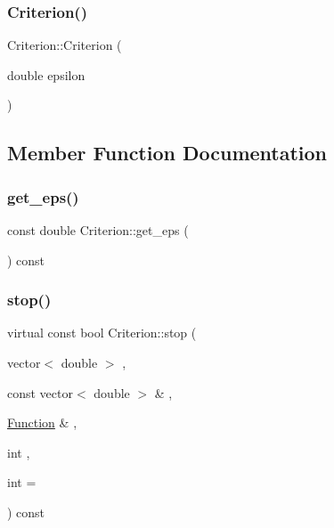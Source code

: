 \subsubsection{\texorpdfstring{Criterion()}{Criterion()}}
{\footnotesize\ttfamily Criterion\+::\+Criterion (\begin{DoxyParamCaption}\item[{double}]{epsilon }\end{DoxyParamCaption})\hspace{0.3cm}{\ttfamily [inline]}}



\subsection{Member Function Documentation}
\mbox{\label{class_criterion_aa0bb13b321141cb530b259e190606f81}} 
\subsubsection{\texorpdfstring{get\+\_\+eps()}{get\_eps()}}
{\footnotesize\ttfamily const double Criterion\+::get\+\_\+eps (\begin{DoxyParamCaption}{ }\end{DoxyParamCaption}) const\hspace{0.3cm}{\ttfamily [inline]}}

\mbox{\label{class_criterion_aee3e2148c665c72c50c2f870a3ca8cdc}} 
\subsubsection{\texorpdfstring{stop()}{stop()}}
{\footnotesize\ttfamily virtual const bool Criterion\+::stop (\begin{DoxyParamCaption}\item[{vector$<$ double $>$}]{,  }\item[{const vector$<$ double $>$ \&}]{,  }\item[{\hyperlink{class_function}{Function} \&}]{,  }\item[{int}]{,  }\item[{int}]{ = {} }\end{DoxyParamCaption}) const\hspace{0.3cm}{\ttfamily [pure virtual]}}



